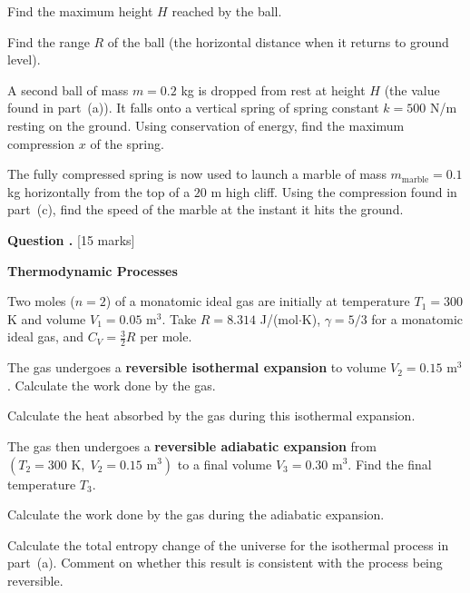 \documentclass[12pt,a4paper]{article}
\newcounter{questioncounter}
\newcommand{\question}[1]{%
  \stepcounter{questioncounter}%
  \vspace{0.5cm}%
  \noindent\textbf{Question \thequestioncounter.} \hfill [#1 marks]%
  \vspace{0.2cm}%
  \par%
}
\begin{document}
\begin{parts}
\item Find the maximum height $H$ reached by the ball. 

\item Find the range $R$ of the ball (the horizontal distance when it returns to ground level). 

\item A second ball of mass $m = 0.2$ kg is dropped from rest at height $H$ (the value found in part~(a)). It falls onto a vertical spring of spring constant $k = 500$ N/m resting on the ground. Using conservation of energy, find the maximum compression $x$ of the spring. 

\item The fully compressed spring is now used to launch a marble of mass $m_{\text{marble}} = 0.1$ kg horizontally from the top of a $20$ m high cliff. Using the compression found in part~(c), find the speed of the marble at the instant it hits the ground. 
\end{parts}

\newpage

\question{15}

\noindent\textbf{Thermodynamic Processes}

\noindent Two moles ($n = 2$) of a monatomic ideal gas are initially at temperature $T_1 = 300$ K and volume $V_1 = 0.05$ m$^3$. Take $R = 8.314$ J/(mol$\cdot$K), $\gamma = 5/3$ for a monatomic ideal gas, and $C_V = \frac{3}{2}R$ per mole.

\begin{parts}
\item The gas undergoes a \textbf{reversible isothermal expansion} to volume $V_2 = 0.15$ m$^3$. Calculate the work done by the gas. 

\item Calculate the heat absorbed by the gas during this isothermal expansion. 

\item The gas then undergoes a \textbf{reversible adiabatic expansion} from $(T_2 = 300\text{ K},\; V_2 = 0.15\text{ m}^3)$ to a final volume $V_3 = 0.30$ m$^3$. Find the final temperature $T_3$. 

\item Calculate the work done by the gas during the adiabatic expansion. 

\item Calculate the total entropy change of the universe for the isothermal process in part~(a). Comment on whether this result is consistent with the process being reversible. 
\end{parts}
\end{document}

